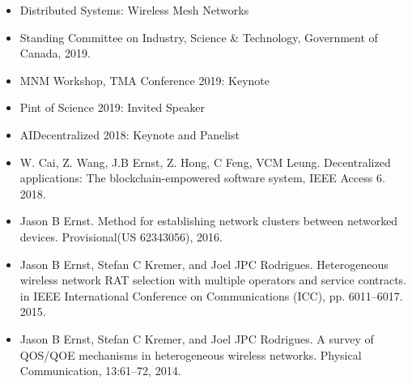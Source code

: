 \documentclass[10pt,a4paper,ragged2e,withhyper]{altacv}
\begin{document}
\begin{paracol}{2}
\divider

\switchcolumn

\begin{itemize}
    \item Distributed Systems: Wireless Mesh Networks
\end{itemize}
\smallskip

\smallskip
\begin{itemize}
    \item Standing Committee on Industry, Science \& Technology, Government of Canada, 2019.
    \item MNM Workshop, TMA Conference 2019: Keynote
    \item Pint of Science 2019: Invited Speaker
    \item AIDecentralized 2018: Keynote and Panelist
\end{itemize}

\smallskip
\begin{itemize}
\item W. Cai, Z. Wang, J.B Ernst, Z. Hong, C Feng, VCM Leung. Decentralized applications: The blockchain-empowered software system, IEEE Access 6. 2018.
\item Jason B Ernst. Method for establishing network clusters between networked devices. Provisional(US 62343056), 2016.
\item Jason B Ernst, Stefan C Kremer, and Joel JPC Rodrigues. Heterogeneous wireless network RAT selection with multiple operators and service contracts. in IEEE International Conference on Communications (ICC), pp. 6011–6017. 2015.
\item Jason B Ernst, Stefan C Kremer, and Joel JPC Rodrigues. A survey of QOS/QOE mechanisms in heterogeneous wireless networks. Physical Communication, 13:61–72, 2014.
\end{itemize}



\smallskip \divider \smallskip


\newpage


\end{paracol}
\end{document}
